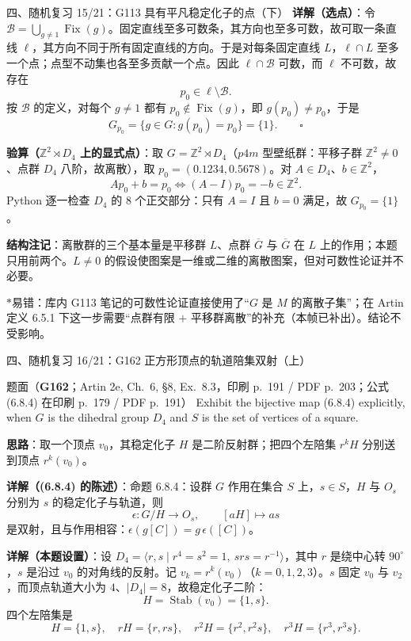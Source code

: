 \documentclass[aspectratio=169,10pt,fontset=none]{ctexbeamer}
\newcommand{\ex}[1]{\textcolor{accent}{\footnotesize\bfseries #1}}
\newcommand{\key}[1]{\textcolor{ink}{\bfseries #1}}
\newcommand{\starpt}{\textcolor{accent}{\bfseries$\ast$}}
\begin{document}
\begin{frame}[t]{四、随机复习 15/21：G113 具有平凡稳定化子的点（下）}
\scriptsize
\key{详解（选点）}：令 $\mathcal B=\bigcup_{g\ne1}\operatorname{Fix}(g)$。固定直线至多可数条，其方向也至多可数，故可取一条直线 $\ell$，其方向不同于所有固定直线的方向。于是对每条固定直线 $L$，$\ell\cap L$ 至多一个点；点型不动集也各至多贡献一个点。因此 $\ell\cap\mathcal B$ 可数，而 $\ell$ 不可数，故存在
\[ p_0\in\ell\setminus\mathcal B. \]
按 $\mathcal B$ 的定义，对每个 $g\ne1$ 都有 $p_0\notin\operatorname{Fix}(g)$，即 $g(p_0)\ne p_0$，于是
\[ G_{p_0}=\{g\in G:g(p_0)=p_0\}=\{1\}. \qquad\square \]

\key{验算（$\mathbb Z^2\rtimes D_4$ 上的显式点）}：取 $G=\mathbb Z^2\rtimes D_4$（$p4m$ 型壁纸群：平移子群 $\mathbb Z^2\ne0$、点群 $D_4$ 八阶，故离散），取 $p_0=(0.1234,0.5678)$。对 $A\in D_4$、$b\in\mathbb Z^2$，
\[ A p_0+b=p_0\iff (A-I)p_0=-b\in\mathbb Z^2. \]
Python 逐一检查 $D_4$ 的 $8$ 个正交部分：只有 $A=I$ 且 $b=0$ 满足，故 $G_{p_0}=\{1\}$。

\key{结构注记}：离散群的三个基本量是平移群 $L$、点群 $\overline G$ 与 $\overline G$ 在 $L$ 上的作用；本题只用前两个。$L\ne0$ 的假设使图案是一维或二维的离散图案，但对可数性论证并不必要。

\starpt 易错：库内 G113 笔记的可数性论证直接使用了“$G$ 是 $M$ 的离散子集”；在 Artin 定义 6.5.1 下这一步需要“点群有限 $+$ 平移群离散”的补充（本帧已补出）。结论不受影响。
\end{frame}

\begin{frame}[t]{四、随机复习 16/21：G162 正方形顶点的轨道\textendash{}陪集双射（上）}
\label{ex:G162}
\scriptsize
\begin{block}{\footnotesize 题面（\ex{G162}；Artin 2e, Ch.~6, §8, Ex.~8.3，印刷 p.~191 / PDF p.~203；公式 (6.8.4) 在印刷 p.~179 / PDF p.~191）}
Exhibit the bijective map (6.8.4) explicitly, when $G$ is the dihedral group $D_4$ and $S$ is the set of vertices of a square.
\end{block}
\key{思路}：取一个顶点 $v_0$，其稳定化子 $H$ 是二阶反射群；把四个左陪集 $r^kH$ 分别送到顶点 $r^k(v_0)$。

\key{详解（(6.8.4) 的陈述）}：命题 6.8.4：设群 $G$ 作用在集合 $S$ 上，$s\in S$，$H$ 与 $O_s$ 分别为 $s$ 的稳定化子与轨道，则
\[ \epsilon:G/H\longrightarrow O_s,\qquad [aH]\longmapsto as \]
是双射，且与作用相容：$\epsilon(g[C])=g\,\epsilon([C])$。

\key{详解（本题设置）}：设 $D_4=\langle r,s\mid r^4=s^2=1,\ srs=r^{-1}\rangle$，其中 $r$ 是绕中心转 $90^\circ$，$s$ 是沿过 $v_0$ 的对角线的反射。记 $v_k=r^k(v_0)$（$k=0,1,2,3$）。$s$ 固定 $v_0$ 与 $v_2$，而顶点轨道大小为 $4$、$|D_4|=8$，故稳定化子二阶：
\[ H=\operatorname{Stab}(v_0)=\{1,s\}. \]
四个左陪集是
\[ H=\{1,s\},\quad rH=\{r,rs\},\quad r^2H=\{r^2,r^2s\},\quad r^3H=\{r^3,r^3s\}. \]
\end{frame}
\end{document}
